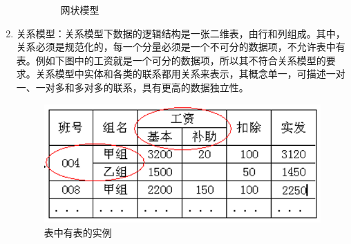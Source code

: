 \documentclass[chapter.computer_science.tex]{subfiles}
\begin{document}
\begin{enumerate}
\begin{enumerate}
\begin{figure}[H]
                    \caption{网状模型}
                \end{figure}
        \end{enumerate}
    \item 关系模型：关系模型下数据的逻辑结构是一张二维表，由行和列组成。其中，关系必须是规范化的，每一个分量必须是一个不可分的数据项，不允许表中有表。例如下图中的工资就是一个可分的数据项，所以其不符合关系模型的要求。关系模型中实体和各类的联系都用关系来表示，其概念单一，可描述一对一、一对多和多对多的联系，具有更高的数据独立性。
        \begin{figure}[H]
            \centering
            \includegraphics[scale=0.5]{./images/0022.png}
            \caption{表中有表的实例}
        \end{figure}
\end{enumerate}
\end{document}
